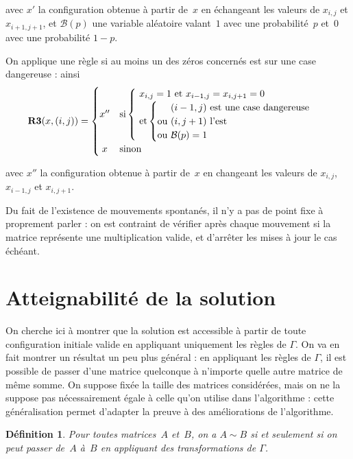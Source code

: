\documentclass[11pt, openany, a4paper]{article}
\newtheorem*{df*}{ \textbf{Définition}}{}
\begin{document}
avec $x'$ la configuration obtenue à partir de~$x$ en échangeant les valeurs de $x_{i,j}$ et $x_{i+1,j+1}$, et $\mathcal{B}(p)$ une variable aléatoire valant~$1$ avec une probabilité~$p$ et~$0$ avec une probabilité $1-p$.

On applique une règle si au moins un des zéros concernés est sur une case dangereuse : ainsi \[
\textbf{R3}(x,(i,j))=
\begin{cases}
  \hfill x'' \hfill & \text {si} \begin{cases}\text{ $x_{i,j}=1$ et $x_{i-1,j}=x_{i,j+1}=0$} \\
    \text{ et} \left\{
        \begin{tabular}{@{}c@{}l}
          &\text{ $(i-1,j)$ est une case dangereuse}\\
          \text {ou}& \text{ $(i,j+1)$ l'est}\\
          \text {ou}& \text{ $\mathcal{B}(p)=1$}\\
        \end{tabular}
      \right.
    \end{cases}
  \\
  \hfill x \hfill & \text {sinon}
\end{cases}
\]

avec $x''$ la configuration obtenue à partir de~$x$ en changeant les valeurs de $x_{i,j}$, $x_{i-1,j}$ et $x_{i,j+1}$.


Du fait de l'existence de mouvements spontanés, il n'y a pas de point fixe à proprement parler : on est contraint de vérifier après chaque mouvement si la matrice représente une multiplication valide, et d'arrêter les mises à jour le cas échéant. 

\section{Atteignabilité de la solution}

On cherche ici à montrer que la solution est accessible à partir de toute configuration initiale valide en appliquant uniquement les règles de $\Gamma$. On va en fait montrer un résultat un peu plus général : en appliquant les règles de $\Gamma$, il est possible de passer d'une matrice quelconque à n'importe quelle autre matrice de même somme. On suppose fixée la taille des matrices considérées, mais on ne la suppose pas nécessairement égale à celle qu'on utilise dans l'algorithme : cette généralisation permet d'adapter la preuve à des améliorations de l'algorithme.

\begin{df*}
Pour toutes matrices~$A$ et~$B$, on a $A\sim B$ si et seulement si on peut passer de~$A$ à~$B$ en appliquant des transformations de $\Gamma$.
\end{df*}
\end{document}
